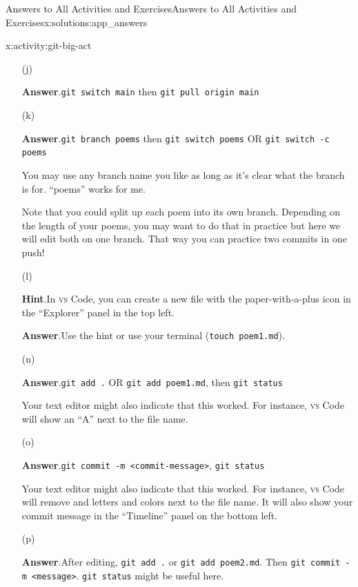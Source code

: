 \documentclass[oneside,10pt,]{book}
\newcommand{\blocktitlefont}{\relax}
\newcommand{\mono}[1]{\texttt{#1}}
\newcommand{\initialism}[1]{\textsc{\MakeLowercase{#1}}}
\begin{document}
\begin{solutions-chapter}{Answers to All Activities and Exercises}{}{Answers to All Activities and Exercises}{}{}{x:solutions:app_answers}
\begin{activitysolution}{4.11}{}{x:activity:git-big-act}
\begin{enumerate}[font=\bfseries,label=(\alph*),ref=\alph*]
\item[(j)]\par\smallskip%
\noindent\textbf{\blocktitlefont Answer}.\hypertarget{g:answer:idm479665240-back}{}\quad{}\mono{git switch main} then \mono{git pull origin main}%
\item[(k)]\par\smallskip%
\noindent\textbf{\blocktitlefont Answer}.\hypertarget{g:answer:idm479660888-back}{}\quad{}\mono{git branch poems} then \mono{git switch poems} OR \mono{git switch -c poems}%
\par
You may use any branch name you like as long as it's clear what the branch is for. ``poems'' works for me.%
\par
Note that you could split up each poem into its own branch. Depending on the length of your poems, you may want to do that in practice but here we will edit both on one branch. That way you can practice two commits in one push!%
\item[(l)]\par\smallskip%
\noindent\textbf{\blocktitlefont Hint}.\hypertarget{g:hint:idm479654744-back}{}\quad{}In \initialism{VS} Code, you can create a new file with the paper-with-a-plus icon in the ``Explorer'' panel in the top left.%
\par\smallskip%
\noindent\textbf{\blocktitlefont Answer}.\hypertarget{g:answer:idm479659736-back}{}\quad{}Use the hint or use your terminal (\mono{touch poem1.md}).%
\item[(n)]\par\smallskip%
\noindent\textbf{\blocktitlefont Answer}.\hypertarget{g:answer:idm479660504-back}{}\quad{}\mono{git add .} OR \mono{git add poem1.md}, then \mono{git status}%
\par
Your text editor might also indicate that this worked. For instance, \initialism{VS} Code will show an ``A'' next to the file name.%
\item[(o)]\par\smallskip%
\noindent\textbf{\blocktitlefont Answer}.\hypertarget{g:answer:idm479657176-back}{}\quad{}\mono{git commit -m \textquotedbl{}<commit-message>\textquotedbl{}}, \mono{git status}%
\par
Your text editor might also indicate that this worked. For instance, \initialism{VS} Code will remove and letters and colors next to the file name. It will also show your commit message in the ``Timeline'' panel on the bottom left.%
\item[(p)]\par\smallskip%
\noindent\textbf{\blocktitlefont Answer}.\hypertarget{g:answer:idm479645016-back}{}\quad{}After editing, \mono{git add .} or \mono{git add poem2.md}. Then \mono{git commit -m \textquotedbl{}<message>\textquotedbl{}}. \mono{git status} might be useful here.%

\end{enumerate}
\end{activitysolution}
\end{solutions-chapter}
\end{document}
